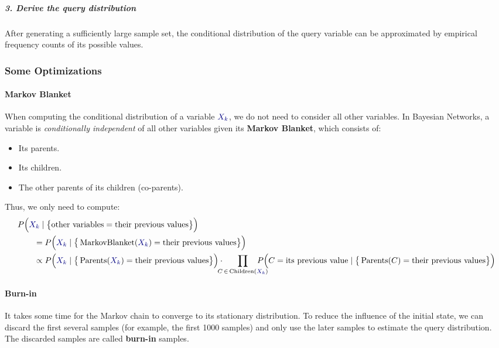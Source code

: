 \documentclass[10pt,UTF8]{article}
\theoremstyle{definition}
\newtheorem{definition inner}{Definition}[section]
\theoremstyle{definition}
\newtheorem{theorem inner}{Theorem}[section]
\theoremstyle{definition}
\newtheorem*{proof inner}{\textit{Proof}}
\theoremstyle{plain}
\newtheorem{tip inner}{Tip}[section]
\theoremstyle{remark}
\DeclareMathOperator{\Pa}{Parents} %
\DeclareMathOperator{\Ch}{Children} %
\DeclareMathOperator{\MB}{MarkovBlanket} %
\newcommand{\blue}[1]{{\color{blue!50!black}#1}} %
\begin{document}
\subparagraph*{3. Derive the query distribution}
After generating a sufficiently large sample set,
the conditional distribution of the query variable can be
approximated by empirical frequency counts of its possible values.

\subsubsection{Some Optimizations}

\paragraph*{Markov Blanket}
When computing the conditional distribution of a variable \(\blue{X_k}\),
we do not need to consider all other variables.
In Bayesian Networks,
a variable is \emph{conditionally independent} of all other variables
given its \textbf{Markov Blanket}, which consists of:
\begin{itemize}
  \item Its parents.
  \item Its children.
  \item The other parents of its children (co-parents).
\end{itemize}
Thus, we only need to compute:
\begin{align*}
  & P\Big(\blue{X_k} \mid
  \big \{ \text{other variables} = \text{their previous values} \big \} \Big) \\
  &\qquad = P\Big(\blue{X_k} \mid
  \big \{ \MB(\blue{X_k}) = \text{their previous values} \big \} \Big) \\
  &\qquad \propto P\Big(\blue{X_k} \mid
  \big \{ \Pa(\blue{X_k}) = \text{their previous values} \big \} \Big) \cdot
  \! \! \! \! \!
  \prod_{C \, \in \, \Ch(\blue{X_k})} \! \! \! \! \! \! \! \! \!
  P\Big(C = \text{its previous value} \mid
  \big \{ \Pa(C) = \text{their previous values} \big \} \Big)
\end{align*}

\paragraph*{Burn-in}
It takes some time for the Markov chain to converge to
its stationary distribution.
To reduce the influence of the initial state,
we can discard the first several samples (for example, the first 1000 samples)
and only use the later samples to estimate the query distribution.
The discarded samples are called \textbf{burn-in} samples.
\end{document}
